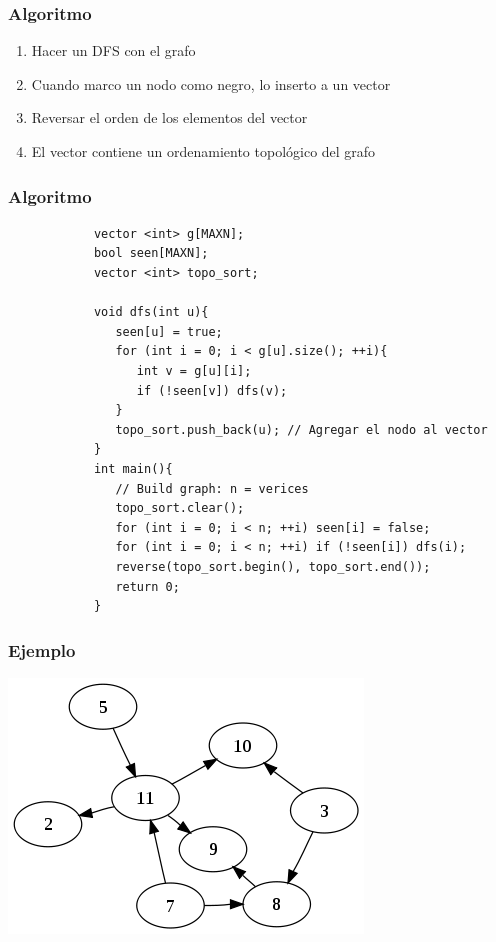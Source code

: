 \documentclass{beamer}
\begin{document}
	\begin{frame}
		\frametitle{Algoritmo}
		\begin{enumerate}
			\item Hacer un DFS con el grafo
			\item Cuando marco un nodo como negro, lo inserto a un vector
			\item Reversar el orden de los elementos del vector
			\item El vector contiene un ordenamiento topológico del grafo
		\end{enumerate}
	\end{frame}
	
	\begin{frame}[fragile]
		\frametitle{Algoritmo}
		\begin{lstlisting}
			vector <int> g[MAXN];
			bool seen[MAXN];
			vector <int> topo_sort;

			void dfs(int u){
			   seen[u] = true;
			   for (int i = 0; i < g[u].size(); ++i){
			      int v = g[u][i];
			      if (!seen[v]) dfs(v);
			   }
			   topo_sort.push_back(u); // Agregar el nodo al vector
			}
			int main(){
			   // Build graph: n = verices 
			   topo_sort.clear();
			   for (int i = 0; i < n; ++i) seen[i] = false;   
			   for (int i = 0; i < n; ++i) if (!seen[i]) dfs(i);  
			   reverse(topo_sort.begin(), topo_sort.end());
			   return 0;
			}
		\end{lstlisting}
	\end{frame}
	
	\begin{frame}
		\frametitle{Ejemplo}
		\begin{center} \includegraphics[height = 0.7\textheight]{DAG.png} \end{center}
	\end{frame}
	
\end{document}
